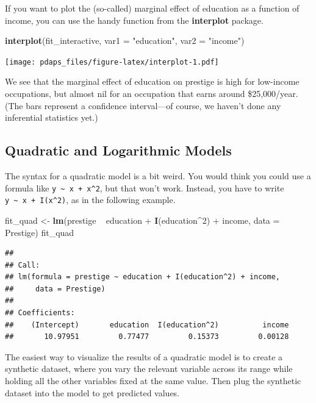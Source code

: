 \documentclass[12pt,oneside,openany]{book}
\newenvironment{Shaded}{\begin{snugshade}}{\end{snugshade}}
\newcommand{\KeywordTok}[1]{\textcolor[rgb]{0.13,0.29,0.53}{\textbf{{#1}}}}
\newcommand{\DataTypeTok}[1]{\textcolor[rgb]{0.13,0.29,0.53}{{#1}}}
\newcommand{\DecValTok}[1]{\textcolor[rgb]{0.00,0.00,0.81}{{#1}}}
\newcommand{\StringTok}[1]{\textcolor[rgb]{0.31,0.60,0.02}{{#1}}}
\newcommand{\NormalTok}[1]{{#1}}
\begin{document}
If you want to plot the (so-called) marginal effect of education as a
function of income, you can use the handy function from the
\textbf{interplot} package.

\begin{Shaded}
\begin{Highlighting}[]
\KeywordTok{interplot}\NormalTok{(fit_interactive, }\DataTypeTok{var1 =} \StringTok{"education"}\NormalTok{, }\DataTypeTok{var2 =} \StringTok{"income"}\NormalTok{)}
\end{Highlighting}
\end{Shaded}

\texttt{[image: pdaps\_files/figure-latex/interplot-1.pdf]}

We see that the marginal effect of education on prestige is high for
low-income occupations, but almost nil for an occupation that earns
around \$25,000/year. (The bars represent a confidence interval---of
course, we haven't done any inferential statistics yet.)

\subsection{Quadratic and Logarithmic
Models}\label{quadratic-and-logarithmic-models}

The syntax for a quadratic model is a bit weird. You would think you
could use a formula like \texttt{y\ \textasciitilde{}\ x\ +\ x\^{}2},
but that won't work. Instead, you have to write
\texttt{y\ \textasciitilde{}\ x\ +\ I(x\^{}2)}, as in the following
example.

\begin{Shaded}
\begin{Highlighting}[]
\NormalTok{fit_quad <-}\StringTok{ }\KeywordTok{lm}\NormalTok{(prestige ~}\StringTok{ }\NormalTok{education +}\StringTok{ }\KeywordTok{I}\NormalTok{(education^}\DecValTok{2}\NormalTok{) +}\StringTok{ }\NormalTok{income, }\DataTypeTok{data =} \NormalTok{Prestige)}
\NormalTok{fit_quad}
\end{Highlighting}
\end{Shaded}

\begin{verbatim}
## 
## Call:
## lm(formula = prestige ~ education + I(education^2) + income, 
##     data = Prestige)
## 
## Coefficients:
##    (Intercept)       education  I(education^2)          income  
##       10.97951         0.77477         0.15373         0.00128
\end{verbatim}

The easiest way to visualize the results of a quadratic model is to
create a synthetic dataset, where you vary the relevant variable across
its range while holding all the other variables fixed at the same value.
Then plug the synthetic dataset into the model to get predicted values.
\end{document}
